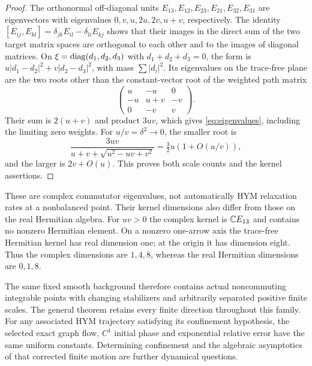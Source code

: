 \begin{proof}
The orthonormal off-diagonal units
$E_{13},E_{12},E_{23},E_{21},E_{32},E_{31}$
are eigenvectors with eigenvalues
$0,v,u,2u,2v,u+v$, respectively. The identity
$[E_{ij},E_{kl}]=\delta_{jk}E_{il}-\delta_{li}E_{kj}$
shows that their images in the direct sum of the
two target matrix spaces are orthogonal to each
other and to the images of diagonal matrices.
On $\xi=\operatorname{diag}(d_1,d_2,d_3)$ with
$d_1+d_2+d_3=0$, the form is
$u|d_1-d_2|^2+v|d_2-d_3|^2$, with mass
$\sum|d_i|^2$. Its eigenvalues on the trace-free
plane are
the two roots other than the constant-vector
root of the weighted path matrix
\[
 \begin{pmatrix}
 u&-u&0\\
 -u&u+v&-v\\
 0&-v&v
 \end{pmatrix}.
\]
Their sum is $2(u+v)$ and product $3uv$,
which gives \eqref{eq:eigenvalues}, including
the limiting zero weights. For $u/v=\delta^2\to0$,
the smaller root is
\[
 \frac{3uv}{u+v+\sqrt{u^2-uv+v^2}}
       =\tfrac32u(1+O(u/v)),
\]
and the larger is $2v+O(u)$. This proves both
scale counts and the kernel assertions.
\end{proof}

These are complex commutator eigenvalues, not
automatically HYM relaxation rates at a
nonbalanced point. Their kernel dimensions also
differ from those on the real Hermitian algebra.
For $uv>0$ the complex kernel is $\mathbb C E_{13}$
and contains no nonzero Hermitian element.
On a nonzero one-arrow axis the trace-free
Hermitian kernel has real dimension one;
at the origin it has dimension eight.
Thus the complex dimensions are $1,4,8$,
whereas the real Hermitian dimensions are $0,1,8$.

The same fixed smooth background therefore
contains actual noncommuting integrable points
with changing stabilizers and arbitrarily
separated positive finite scales. The general
theorem retains every finite direction throughout
this family. For any associated HYM trajectory
satisfying its confinement hypothesis, the
selected exact graph flow, $C^1$ initial phase
and exponential relative error have the same
uniform constants. Determining confinement
and the algebraic asymptotics of that corrected
finite motion are further dynamical questions.
